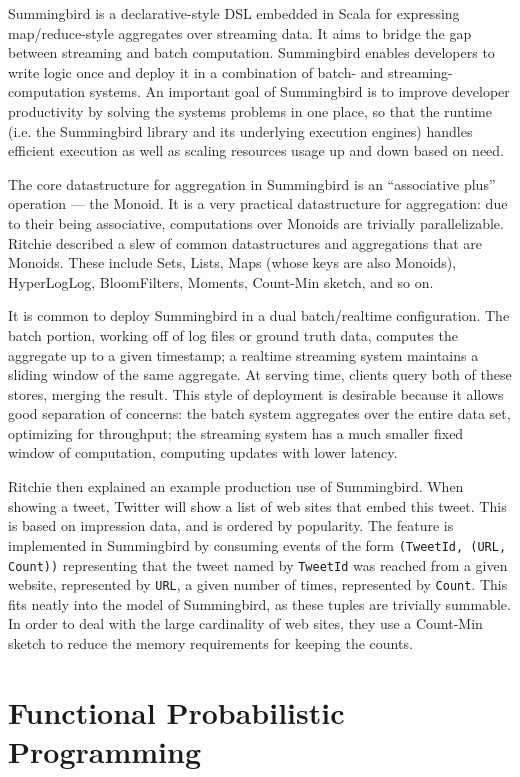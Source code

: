 \documentclass{jfp1}
\begin{document}
Summingbird is a declarative-style DSL embedded in Scala for expressing map/reduce-style
aggregates over streaming data. It aims to bridge the gap between
streaming and batch computation. Summingbird enables developers to write logic
once and deploy it in a combination of batch- and
streaming-computation systems. An important goal of Summingbird is to
improve developer productivity by solving the systems problems in one
place, so that the runtime (i.e. the Summingbird library and its
underlying execution engines) handles efficient execution as well as
scaling resources usage up and down based on need.

The core datastructure for aggregation in Summingbird is an
``associative plus'' operation --- the Monoid. It is a very practical
datastructure for aggregation: due to their being associative,
computations over Monoids are trivially parallelizable. Ritchie
described a slew of common datastructures and aggregations that are
Monoids. These include Sets, Lists, Maps (whose keys are also
Monoids), HyperLogLog, BloomFilters, Moments, Count-Min sketch, and so on.

It is common to deploy Summingbird in a dual batch/realtime
configuration. The batch portion, working off of log files or ground
truth data, computes the aggregate up to a given timestamp; a realtime
streaming system maintains a sliding window of the same aggregate. At
serving time, clients query both of these stores, merging the result.
This style of deployment is desirable because it allows good
separation of concerns: the batch system aggregates over the entire
data set, optimizing for throughput; the streaming system has a much
smaller fixed window of computation, computing updates with lower
latency.

Ritchie then explained an example production use of Summingbird. When
showing a tweet, Twitter will show a list of web sites that embed this
tweet. This is based on impression data, and is ordered by popularity.
The feature is implemented in Summingbird by consuming events of
the form \texttt{(TweetId, (URL, Count))} representing that
the tweet named by \texttt{TweetId} was reached from a given website,
represented by \texttt{URL}, a given number of times, represented by 
\texttt{Count}. This fits neatly into the model of Summingbird, as
these tuples are trivially summable. In order to deal with the large
cardinality of web sites, they use a Count-Min sketch to 
reduce the memory requirements for keeping the counts.

\section{Functional Probabilistic Programming}
\end{document}
